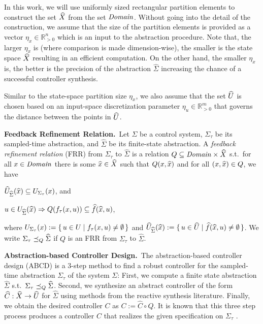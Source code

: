 In this work, we will use uniformly sized rectangular partition elements to construct the set $\widehat{X}$ from the set $\mathit{Domain}$.
Without going into the detail of the construction, we assume that the size of the partition elements is provided as a vector $\eta_x\in \mathbb{R}^n_{>0}$ which is an input to the abstraction procedure.
Note that, the larger $\eta_x$ is (where comparison is made dimension-wise), the smaller is the state space $\widehat{X}$ resulting in an efficient computation.
On the other hand, the smaller $\eta_x$ is, the better is the precision of the abstraction $\widehat{\Sigma}$ increasing the chance of a successful controller synthesis.

Similar to the state-space partition size $\eta_x$, we also assume that the set $\widehat{U}$ is chosen based on an input-space discretization parameter $\eta_u\in \mathbb{R}^m_{>0}$ that governs the distance between the points in $\widehat{U}$.

\smallskip
\noindent\textbf{Feedback Refinement Relation.}\
Let $\Sigma$ be a control system, $\Sigma_\tau$ be its sampled-time abstraction, and $\widehat{\Sigma}$ be its finite-state abstraction.
A \emph{feedback refinement relation} (FRR) from $\Sigma_\tau$ to $\widehat{\Sigma}$ 
is a relation $Q\subseteq \mathit{Domain}\times \widehat{X}$ s.t.\ 
for all $x\in \mathit{Domain}$ there is some $\widehat{x}\in \widehat{X}$ such that $Q(x,\widehat{x})$ and
for all $(x,\widehat{x})\in Q$, we have
\begin{inparaenum}[(i)]
 \item $\widehat{U}_{\widehat{\Sigma}}(\widehat{x})\subseteq U_{\Sigma_\tau}(x)$, and 
 \item $u\in U_{\widehat{\Sigma}}(\widehat{x}) \Rightarrow Q(f_\tau(x,u))\subseteq \widehat{f}(\widehat{x},u)$,
\end{inparaenum}
where $U_{\Sigma_\tau}(x):=\set{u\in U \mid f_\tau(x,u)\neq \emptyset}$ and $\widehat{U}_{\widehat{\Sigma}}(\widehat{x}):=\set{u\in \widehat{U}\mid \widehat{f}(\widehat{x},u)\neq \emptyset}$.
We write $\Sigma_\tau \preceq_{Q} \widehat{\Sigma}$ if $Q$ is an FRR from $\Sigma_\tau$ to $\widehat{\Sigma}$.

\smallskip
\noindent\textbf{Abstraction-based Controller Design.}\
The abstraction-based controller design (ABCD) \cite{reissig2016feedback} is a $3$-step method to find a robust controller for the sampled-time abstraction $\Sigma_\tau$ of the system $\Sigma$:
First, we compute a finite state abstraction $\widehat{\Sigma}$ s.t.\ $\Sigma_\tau \preceq_{Q} \widehat{\Sigma}$.
Second, we synthesize an abstract controller of the form $\widehat{C}:\widehat{X}\rightarrow \widehat{U}$ for $\widehat{\Sigma}$ using methods from the reactive synthesis literature.
Finally, we obtain the desired controller $C$ as $C:=\widehat{C}\circ Q$.
It is known that this three step process produces a controller $C$ that realizes the given specification on $\Sigma_\tau$ \cite{reissig2016feedback}.

